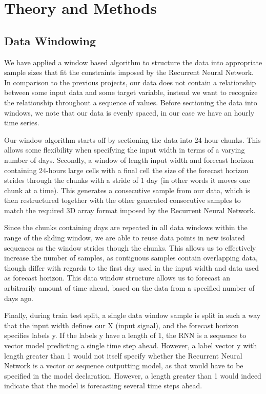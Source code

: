 \documentclass
[twocolumn,
secnumarabic,
nobibnotes,
aps,
prl,
reprint,
groupedaddress,
amsmath,
amssymb,
]{revtex4-2}
\begin{document}
\section{Theory and Methods}
\subsection{Data Windowing}
We have applied a window based algorithm to structure the data into appropriate sample sizes that fit the constraints imposed by the Recurrent Neural Network. In comparison to the previous projects, our data does not contain a relationship between some input data and some target variable, instead we want to recognize the relationship throughout a sequence of values. Before sectioning the data into windows, we note that our data is evenly spaced, in our case we have an hourly time series. 

Our window algorithm starts off by sectioning the data into 24-hour chunks. This allows some flexibility when specifying the input width in terms of a varying number of days. Secondly, a window of length input width and forecast horizon containing 24-hours large cells with a final cell the size of the forecast horizon strides through the chunks with a stride of $1$ day (in other words it moves one chunk at a time). This generates a consecutive sample from our data, which is then restructured together with the other generated consecutive samples to match the required 3D array format imposed by the Recurrent Neural Network.

Since the chunks containing days are repeated in all data windows within the range of the sliding window, we are able to reuse data points in new isolated sequences as the window strides though the chunks. This allows us to effectively increase the number of samples, as contiguous samples contain overlapping data, though differ with regards to the first day used in the input width and data used as forecast horizon. This data window structure allows us to forecast an arbitrarily amount of time ahead, based on the data from a specified number of days ago.

Finally, during train test split, a single data window sample is split in such a way that the input width defines our X (input signal), and the forecast horizon specifies labels y. If the labels y have a length of 1, the RNN is a sequence to vector model predicting a single time step ahead. However, a label vector y with length greater than 1 would not itself specify whether the Recurrent Neural Network is a vector or sequence outputting model, as that would have to be specified in the model declaration. However, a length greater than 1 would indeed indicate that the model is forecasting several time steps ahead. 
\end{document}
